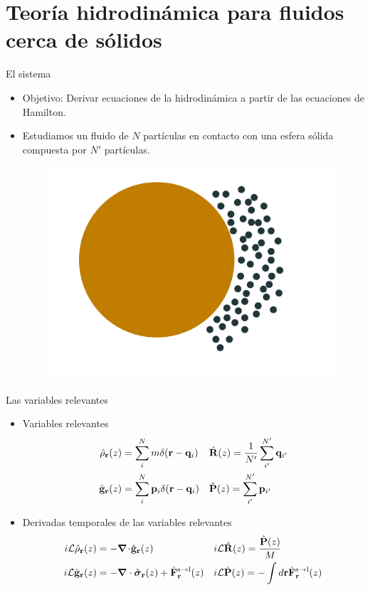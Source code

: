 \documentclass{beamer}
\newcommand{\esc}{\!\cdot\!}
\begin{document}
\section{Teoría hidrodinámica para fluidos cerca de sólidos}
\begin{frame}{El sistema}
  \begin{itemize}
    \item<1-> \alert{Objetivo}: Derivar ecuaciones de la hidrodinámica a partir de las ecuaciones de Hamilton. 
    \item<2-> Estudiamos un fluido de $N$ partículas en contacto con una esfera sólida compuesta por $N'$ partículas.
  \begin{figure}
  \includegraphics[width=.6\linewidth]{esfera}
  \end{figure}
  \end{itemize}
\end{frame}
   
   \begin{frame}{Las variables relevantes}
     \begin{itemize}
    \item<1-> Variables relevantes
      \begin{align}
        \hat{\rho}_{\bf r}(z) &=\sum^{N}_im\delta({\bf r}-{\bf q}_i)
      &&\hat{\bf R}(z)=\frac{1}{N'}\sum_{i'}^{N'}{\bf q}_{i'}
      \nonumber\\
        \hat{\bf g}_{\bf r}(z) &=\sum^{N}_i{\bf p}_i\delta({\bf r}-{\bf q}_i)
      &&\hat{\bf P}(z)=\sum_{i'}^{N'}{\bf p}_{i'}
      \nonumber
      \end{align}
    \item<2-> Derivadas temporales de las variables relevantes
      \begin{align}
        i{\cal L} \hat{\rho}_{\bf r}(z) &= -\boldsymbol{\nabla}\esc\hat{\bf g}_{\bf r}(z)
        && i{\cal L}\hat{\bf R}(z) =\frac{\hat{\bf P}(z)}{M}
      \nonumber\\
      i{\cal L}\hat{\bf g}_{\bf r}(z)
          &=-\boldsymbol{\nabla}\cdot \hat{\boldsymbol{\sigma}}_{\bf r}(z)+\hat{{\bf F}}^{\rm s\to l}_{\bf r}(z) 
        &&i{\cal L}\hat{\bf P}(z) =-\int  d{\bf r} \hat{\bf F}^{\rm s\to l}_{\bf r}(z)
         \nonumber
\end{align}
    \end{itemize}
\end{frame}
\end{document}
